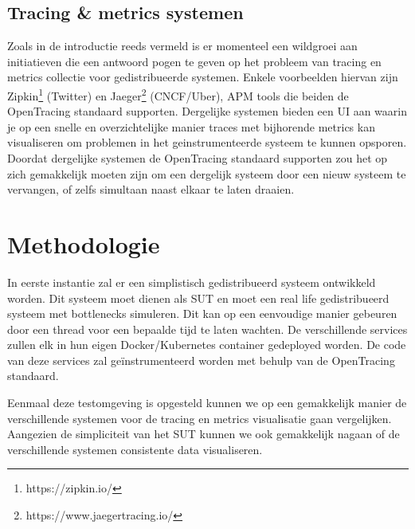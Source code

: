 \subsection{Tracing \& metrics systemen}
Zoals in de introductie reeds vermeld is er momenteel een wildgroei aan initiatieven die een antwoord pogen te geven op het probleem van tracing en metrics collectie voor gedistribueerde systemen. Enkele voorbeelden hiervan zijn Zipkin\footnote{https://zipkin.io/} (Twitter) en Jaeger\footnote{https://www.jaegertracing.io/} (\gls{CNCF}/Uber), \gls{APM} tools die beiden de OpenTracing standaard supporten. Dergelijke systemen bieden een UI aan waarin je op een snelle en overzichtelijke manier traces met bijhorende metrics kan visualiseren om problemen in het geinstrumenteerde systeem te kunnen opsporen. Doordat dergelijke systemen de OpenTracing standaard supporten zou het op zich gemakkelijk moeten zijn om een dergelijk systeem door een nieuw systeem te vervangen, of zelfs simultaan naast elkaar te laten draaien.



\section{Methodologie}
\label{sec:methodologie}

In eerste instantie zal er een simplistisch gedistribueerd systeem ontwikkeld worden. Dit systeem moet dienen als \gls{SUT} en moet een real life gedistribueerd systeem met bottlenecks simuleren. Dit kan op een eenvoudige manier gebeuren door een thread voor een bepaalde tijd te laten wachten. De verschillende services zullen elk in hun eigen Docker/Kubernetes container gedeployed worden. De code van deze services zal geïnstrumenteerd worden met behulp van de OpenTracing standaard.

Eenmaal deze testomgeving is opgesteld kunnen we op een gemakkelijk manier de verschillende systemen voor de tracing en metrics visualisatie gaan vergelijken. Aangezien de simpliciteit van het \gls{SUT} kunnen we ook gemakkelijk nagaan of de verschillende systemen consistente data visualiseren.

